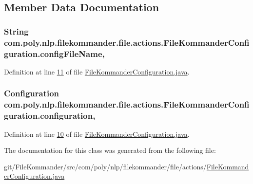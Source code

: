 \subsection{Member Data Documentation}
\hypertarget{classcom_1_1poly_1_1nlp_1_1filekommander_1_1file_1_1actions_1_1_file_kommander_configuration_ac737e4b5403a98e4922435bd38bedb2d}{
\subsubsection[{config\-File\-Name}]{\setlength{\rightskip}{0pt plus 5cm}String com.\-poly.\-nlp.\-filekommander.\-file.\-actions.\-File\-Kommander\-Configuration.\-config\-File\-Name\hspace{0.3cm}{\ttfamily [static]}, {\ttfamily [private]}}}\label{classcom_1_1poly_1_1nlp_1_1filekommander_1_1file_1_1actions_1_1_file_kommander_configuration_ac737e4b5403a98e4922435bd38bedb2d}


Definition at line \hyperlink{L11}{11} of file \hyperlink{}{File\-Kommander\-Configuration.\-java}.

\hypertarget{classcom_1_1poly_1_1nlp_1_1filekommander_1_1file_1_1actions_1_1_file_kommander_configuration_af384cf1346411acf76036936b6ad43d3}{
\subsubsection[{configuration}]{\setlength{\rightskip}{0pt plus 5cm}Configuration com.\-poly.\-nlp.\-filekommander.\-file.\-actions.\-File\-Kommander\-Configuration.\-configuration\hspace{0.3cm}{\ttfamily [static]}, {\ttfamily [private]}}}\label{classcom_1_1poly_1_1nlp_1_1filekommander_1_1file_1_1actions_1_1_file_kommander_configuration_af384cf1346411acf76036936b6ad43d3}


Definition at line \hyperlink{L10}{10} of file \hyperlink{}{File\-Kommander\-Configuration.\-java}.



The documentation for this class was generated from the following file\-:\begin{DoxyCompactItemize}
\item 
git/\-File\-Kommander/src/com/poly/nlp/filekommander/file/actions/\hyperlink{_file_kommander_configuration_8java}{File\-Kommander\-Configuration.\-java}\end{DoxyCompactItemize}
